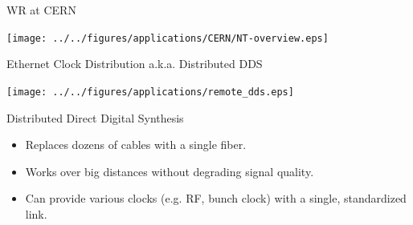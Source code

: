 \documentclass[compress,red]{beamer}
\begin{document}
\begin{frame}{WR at CERN}

    \begin{center}
      \texttt{[image: ../../figures/applications/CERN/NT-overview.eps]}
    \end{center}

\end{frame}
\begin{frame}{Ethernet Clock Distribution a.k.a. Distributed DDS}
  \begin{center}
    \texttt{[image: ../../figures/applications/remote\_dds.eps]}
  \end{center}
  \begin{block}{Distributed Direct Digital Synthesis}
    \begin{itemize}
    \item Replaces dozens of cables with a single fiber.
    \item Works over big distances without degrading signal quality.
    \item Can provide various clocks (e.g. RF, bunch clock) with a single, standardized link.
    \end{itemize}
  \end{block}
\end{frame}
\end{document}
